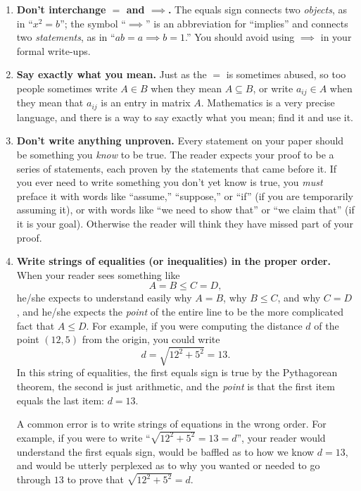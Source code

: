 \begin{enumerate}
\item \textbf{Don't interchange \({=}\) and \({\implies}\).} The equals sign connects two \emph{objects}, as in ``\(x^2=b\)''; the symbol ``\(\implies\)'' is an abbreviation for ``implies'' and connects two \emph{statements}, as in ``\(ab=a \implies b=1\).''  You should avoid using \(\implies\) in your formal write-ups.

\item \textbf{Say exactly what you mean.} Just as the \(=\) is sometimes abused, so too people sometimes write \(A\in B\) when they mean \(A\subseteq B\), or write \(a_{ij}\in A\) when they mean that \(a_{ij}\) is an entry in matrix \(A\). Mathematics is a very precise language, and there is a way to say exactly what you mean; find it and use it.

\item \textbf{Don't write anything unproven.} Every statement on your paper should be something you \emph{know} to be true. The reader expects your proof to be a series of statements, each proven by the statements that came before it. If you ever need to write something you don't yet know is true, you \emph{must} preface it with words like ``assume,'' ``suppose,'' or ``if'' (if you are temporarily assuming it), or with words like ``we need to show that'' or ``we claim that'' (if it is your goal). Otherwise the reader will think they have missed part of your proof.

\item \textbf{Write strings of equalities (or inequalities) in the proper order.} When your reader sees something like
\[
A=B\leq C=D,
\]
he/she expects to understand easily why \(A=B\), why \(B\leq C\), and why \(C=D\), and he/she expects the \emph{point} of the entire line to be the more complicated fact that \(A\leq D\). For example, if you were computing the distance \(d\) of the point \((12,5)\) from the origin, you could write
\[
d = \sqrt{12^2+5^2} = 13.
\]
In this string of equalities, the first equals sign is true by the Pythagorean theorem, the second is just arithmetic, and the \emph{point} is that the first item equals the last item: \(d=13\).

A common error is to write strings of equations in the wrong order. For example, if you were to write ``\(\sqrt{12^2+5^2}=13=d\)'', your reader would understand the first equals sign, would be baffled as to how we know \(d=13\), and would be utterly perplexed as to why you wanted or needed to go through \(13\) to prove that \(\sqrt{12^2+5^2}=d\).


\end{enumerate}
